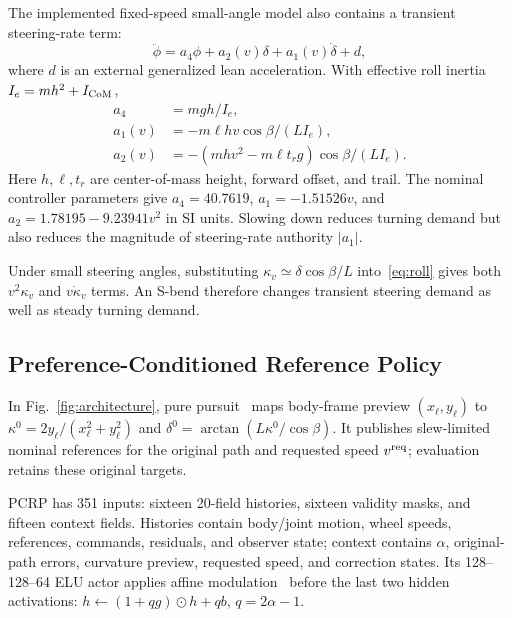 \documentclass[journal]{IEEEtran}
\begin{document}
The implemented fixed-speed small-angle model also contains a transient steering-rate term:
\begin{equation}
 \ddot\phi=a_4\phi+a_2(v)\delta+a_1(v)\dot\delta+d,
 \label{eq:roll}
\end{equation}
where $d$ is an external generalized lean acceleration. With effective roll inertia $I_e=mh^2+I_{\rm CoM}$,
\begin{align}
 a_4&=mgh/I_e,\nonumber\\
 a_1(v)&=-m\ell hv\cos\beta/(LI_e),\nonumber\\
 a_2(v)&=-(mhv^2-m\ell t_rg)\cos\beta/(LI_e).
 \label{eq:coeff}
\end{align}
Here $h,\ell,t_r$ are center-of-mass height, forward offset, and trail. The nominal controller parameters give $a_4=40.7619$, $a_1=-1.51526v$, and $a_2=1.78195-9.23941v^2$ in SI units. Slowing down reduces turning demand but also reduces the magnitude of steering-rate authority $|a_1|$.

Under small steering angles, substituting $\kappa_v\simeq\delta\cos\beta/L$ into~\eqref{eq:roll} gives both $v^2\kappa_v$ and $v\dot\kappa_v$ terms. An S-bend therefore changes transient steering demand as well as steady turning demand.

\subsection{Preference-Conditioned Reference Policy}
In Fig.~\ref{fig:architecture}, pure pursuit~\cite{coulter1992} maps body-frame preview $(x_\ell,y_\ell)$ to $\kappa^0=2y_\ell/(x_\ell^2+y_\ell^2)$ and $\delta^0=\arctan(L\kappa^0/\cos\beta)$. It publishes slew-limited nominal references for the original path and requested speed $v^{\rm req}$; evaluation retains these original targets.

PCRP has 351 inputs: sixteen 20-field histories, sixteen validity masks, and fifteen context fields. Histories contain body/joint motion, wheel speeds, references, commands, residuals, and observer state; context contains $\alpha$, original-path errors, curvature preview, requested speed, and correction states. Its 128--128--64 ELU actor applies affine modulation~\cite{perez2017} before the last two hidden activations: $h\leftarrow(1+qg)\odot h+qb$, $q=2\alpha-1$.
\end{document}
